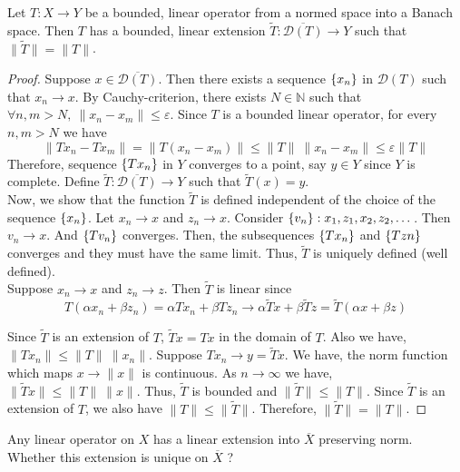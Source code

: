 \begin{theorem}
	Let $T : X \to Y$ be a bounded, linear operator from a normed space into a Banach space.
	Then $T$ has a bounded, linear extension $\tilde{T} : \overline{\mathscr{D}(T)} \to Y$ such that $\|\tilde{T}\| = \|T\|$.
\end{theorem}
\begin{proof}
	Suppose $x \in \overline{\mathscr{D}(T)}$.
	Then there exists a sequence $\left\{x_n\right\}$ in $\mathscr{D}(T)$ such that $x_n \to x$.
	By Cauchy-criterion, there exists $N \in \mathbb{N}$ such that $\forall n,m > N,\ \|x_n - x_m\| \le \varepsilon$.
	Since $T$ is a bounded linear operator, for every $n,m > N$ we have
	\[ \|Tx_n - Tx_m\| = \|T(x_n-x_m)\| \le \|T\| \ \|x_n-x_m\| \le \varepsilon \|T\| \]
	Therefore, sequence $\left\{Tx_n\right\}$ in $Y$ converges to a point, say $y \in Y$ since $Y$ is complete.
	Define $\tilde{T} : \overline{\mathscr{D}(T)} \to Y$ such that $\tilde{T}(x) = y$.\\

	Now, we show that the function $\tilde{T}$ is defined independent of the choice of the sequence $\left\{x_n\right\}$.
	Let $x_n \to x$ and $z_n \to x$.
	Consider $\left\{v_n\right\} : x_1,z_1,x_2,z_2,\dots$.
	Then $v_n \to x$.
	And $\left\{Tv_n\right\}$ converges.
	Then, the subsequences $\left\{Tx_n\right\}$ and $\left\{Tzn\right\}$ converges and they must have the same limit.
	Thus, $\tilde{T}$ is uniquely defined (well defined).\\

	Suppose $x_n \to x$ and $z_n \to z$.
	Then $\tilde{T}$ is linear since 
	\[ T(\alpha x_n + \beta z_n) = \alpha Tx_n + \beta Tz_n \to \alpha \tilde{T}x + \beta \tilde{T}z = \tilde{T}(\alpha x + \beta z) \]

	Since $\tilde{T}$ is an extension of $T$, $\tilde{T}x = Tx$ in the domain of $T$.
	Also we have, $\|Tx_n\| \le \|T\|\ \|x_n\|$.
	Suppose $Tx_n \to y = \tilde{T}x$.
	We have, the norm function which maps $x \to \|x\|$ is continuous.
	As $n \to \infty$ we have, $\| \tilde{T}x \| \le \|T\|\ \|x\|$.
	Thus, $\tilde{T}$ is bounded and $\|\tilde{T}\| \le \|T\|$.
	Since $\tilde{T}$ is an extension of $T$, we also have $\|T\| \le \| \tilde{T}\|$.
	Therefore, $\|\tilde{T}\| = \|T\|$.
\end{proof}

\begin{challenge}
	Any linear operator on $X$ has a linear extension into $\overline{X}$ preserving norm.
	Whether this extension is unique on $\overline{X}$ ?
\end{challenge}

